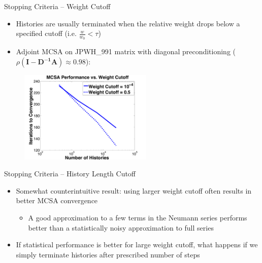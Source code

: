 \documentclass{beamer}
\begin{document}
\begin{frame}{Stopping Criteria -- Weight Cutoff}
  \begin{itemize}
    \item Histories are usually terminated when the relative weight drops
      below a specified cutoff (i.e. $\frac{w}{w_0} < \tau$)
    \vfill
    \item Adjoint MCSA on JPWH\_991 matrix with diagonal preconditioning
      ($\rho ( \mathbf{I-D^{-1}A} ) \approx 0.98$):
  \end{itemize}
\begin{figure}
  \centering
  \includegraphics[width=2.5in]{WtCutoff}
\end{figure}
\end{frame}
\begin{frame}{Stopping Criteria -- History Length Cutoff}
  \begin{itemize}
    \item Somewhat counterintuitive result: using larger weight cutoff often
      results in better MCSA convergence
      \begin{itemize}
        \item A good approximation to a few terms in the Neumann series
          performs better than a statistically noisy approximation to
          full series
      \end{itemize}
    \vfill
    \item If statistical performance is better for large weight cutoff,
      what happens if we simply terminate histories after prescribed number
      of steps
  \end{itemize}
\end{frame}
\end{document}
